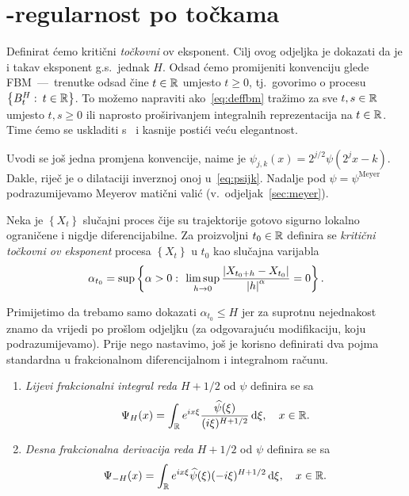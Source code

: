 \documentclass[main.tex]{subfiles}
\begin{document}
\nocite{*}

\section{\holder -regularnost po točkama}\label{sec:holpo}
Definirat ćemo kritični \emph{točkovni} \holder ov eksponent.
Cilj ovog odjeljka je dokazati da je i takav eksponent g.s.\ jednak \( H \). Odsad ćemo promijeniti konvenciju glede FBM~---~trenutke
odsad čine \( t \in \mathbb{R} \) umjesto \( t \ge 0 \), tj.\ govorimo
o procesu \( \left\{ B^H_t \, \colon \, t \in \mathbb{R} \right\} \).
To možemo napraviti ako~\eqref{eq:deffbm} tražimo
za sve \( t,s \in \mathbb{R} \) umjesto \( t,s \ge 0 \) ili
naprosto proširivanjem integralnih reprezentacija na \( t \in \mathbb{R} \).
Time ćemo se uskladiti s~\cite{ayache} i kasnije
postići veću elegantnost.

Uvodi se još jedna promjena konvencije, naime je \( \psi_{j,k}(x) = 2^{j/2}\psi(2^jx-k) \). Dakle, riječ je o dilataciji inverznoj onoj u~\eqref{eq:psijk}.
Nadalje pod \( \psi = \psi^{\mathrm{Meyer}}\) podrazumijevamo
Meyerov matični valić (v.~odjeljak~\ref{sec:meyer}).


\begin{definicija}\label{def:holpo}
	Neka je \( \left\{ X_t \right\} \) slučajni proces čije su trajektorije gotovo sigurno
	lokalno ograničene i nigdje diferencijabilne. Za proizvoljni
	\( t_0 \in \mathbb{R} \) definira se \emph{kritični točkovni \holder ov eksponent} procesa
	\( \left\{ X_t \right\} \) u \( t_0 \) kao slučajna varijabla
	\begin{equation}
		\alpha_{t_0} = \sup \left\{ \alpha > 0 \, \colon \,
		\limsup\limits_{h \rightarrow 0} \frac{\left| {X_{t_0+h}-X_{t_0}} \right|}{\left| {h} \right|^\alpha} = 0
		\right\}.
	\end{equation}
\end{definicija}

Primijetimo da trebamo samo dokazati \( \alpha_{t_0} \le H \)
jer za suprotnu nejednakost znamo da vrijedi po prošlom odjeljku (za odgovarajuću
modifikaciju, koju podrazumijevamo).
Prije nego nastavimo, još je korisno definirati dva pojma
standardna u frakcionalnom diferencijalnom i integralnom računu.

\begin{definicija}
	\begin{enumerate}
		\item \emph{Lijevi frakcionalni integral reda} \( H+1/2 \) od \( \psi \) definira se sa
		      \begin{equation}
			      \Psi_H(x) = \int_{\mathbb{R}} e^{ix\xi} \frac{\widehat{\psi}(\xi)}{(i\xi)^{H+1/2}} \,\mathrm d \xi, \quad x \in \mathbb{R}.
		      \end{equation}
		\item \emph{Desna frakcionalna derivacija reda} \( H+1/2 \) od \( \psi \) definira se sa
		      \begin{equation}
			      \Psi_{-H}(x)= \int_{\mathbb{R}} e^{ix\xi}\widehat{\psi}(\xi)(-i\xi)^{H+1/2} \,\mathrm d \xi, \quad x \in \mathbb{R}.
		      \end{equation}
	\end{enumerate}
\end{definicija}
\end{document}
